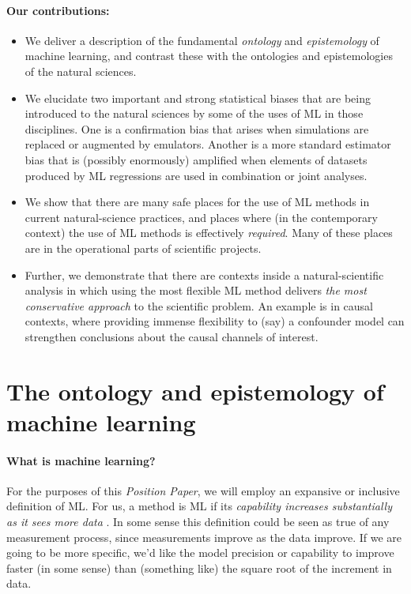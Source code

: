 \documentclass[11pt]{article}
\newcommand{\documentname}{\textsl{Position Paper}}
\begin{document}
\paragraph{Our contributions:}
\begin{itemize}
  \item We deliver a description of the fundamental \emph{ontology} and \emph{epistemology} of machine learning, and contrast these with the ontologies and epistemologies of the natural sciences.
  \item We elucidate two important and strong statistical biases that are being introduced to the natural sciences by some of the uses of ML in those disciplines. One is a confirmation bias that arises when simulations are replaced or augmented by emulators. Another is a more standard estimator bias that is (possibly enormously) amplified when elements of datasets produced by ML regressions are used in combination or joint analyses.
  \item We show that there are many safe places for the use of ML methods in current natural-science practices, and places where (in the contemporary context) the use of ML methods is effectively \emph{required}. Many of these places are in the operational parts of scientific projects.
  \item Further, we demonstrate that there are contexts inside a natural-scientific analysis in which using the most flexible ML method delivers \emph{the most conservative approach} to the scientific problem. An example is in causal contexts, where providing immense flexibility to (say) a confounder model can strengthen conclusions about the causal channels of interest.
\end{itemize}

\section{The ontology and epistemology of machine learning}\label{sec:philosophy}

\paragraph{What is machine learning?}
For the purposes of this \documentname, we will employ an expansive or inclusive definition of ML.
For us, a method is ML if its \emph{capability increases substantially as it sees more data} \cite{ml_definition}.
In some sense this definition could be seen as true of any measurement process, since measurements improve as the data improve. 
If we are going to be more specific, we'd like the model precision or capability to improve faster (in some sense) than (something like) the square root of the increment in data.
\end{document}
